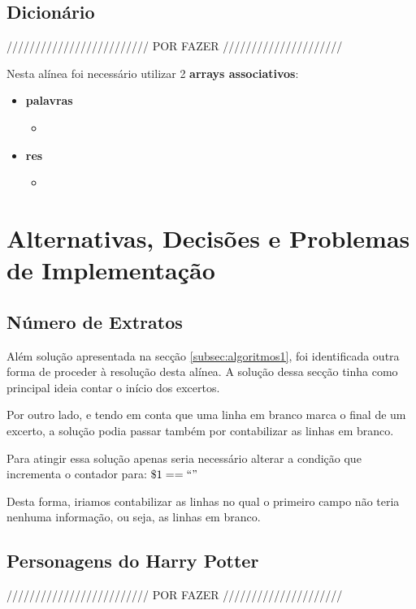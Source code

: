 \documentclass[11pt,a4paper]{report}
\begin{document}
\subsection{Dicionário}

///////////////////////// POR FAZER /////////////////////

Nesta alínea foi necessário utilizar 2 \textbf{arrays associativos}:

\begin{itemize}
	\item \textbf{palavras}
		\begin{itemize}
			\item
		\end{itemize}
	\item \textbf{res}
		\begin{itemize}
			\item
		\end{itemize}
\end{itemize}

\section{Alternativas, Decisões e Problemas de Implementação}

\subsection{Número de Extratos}

Além solução apresentada na secção \ref{subsec:algoritmos1}, foi identificada outra forma de proceder à resolução desta alínea. A solução dessa secção tinha como principal ideia contar o início dos excertos.

Por outro lado, e tendo em conta que uma linha em branco marca o final de um excerto, a solução podia passar também por contabilizar as linhas em branco.

Para atingir essa solução apenas seria necessário alterar a condição que incrementa o contador para: \underline{$\$1==``"$}

Desta forma, iriamos contabilizar as linhas no qual o primeiro campo não teria nenhuma informação, ou seja, as linhas em branco.

\subsection{Personagens do Harry Potter}

///////////////////////// POR FAZER /////////////////////
\end{document}
